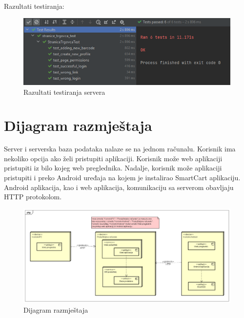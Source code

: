 			Razultati testiranja:
			\begin{figure}[H]
				\centering
				\includegraphics{slike/serverTest.png}
				\caption{Razultati testiranja servera}
				\label{fig:test_server}
			\end{figure}
		\eject
	\section{Dijagram razmještaja}
			Server i serverska baza podataka nalaze se na jednom računalu. Korisnik ima nekoliko opcija ako želi pristupiti aplikaciji. Korisnik može web aplikaciji pristupiti iz bilo kojeg web preglednika. Nadalje, korisnik može aplikaciji pristupiti i preko Android uređaja na kojem je instalirao SmartCart aplikaciju. Android aplikacija, kao i web aplikacija, komunikaciju sa serverom obavljaju HTTP protokolom.
		
			\begin{figure}[H]
				\centering
				\includegraphics[width=1.0\linewidth]{dijagrami/deployment.png}
				\caption{Dijagram razmještaja}
				\label{fig:deployment}
			\end{figure}
		\eject
